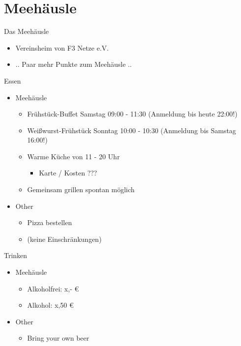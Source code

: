 \section{Meehäusle}

\begin{frame}{Das Meehäusle}
    \begin{itemize}
        \item Vereinsheim von F3 Netze e.V.
        \item .. Paar mehr Punkte zum Meehäusle ..
    \end{itemize}
\end{frame}

\begin{frame}{Essen}
    \begin{itemize}
        \item Meehäusle
        \begin{itemize}
            \item Frühstück-Buffet Samstag 09:00 - 11:30 (Anmeldung bis heute 22:00!)
            \item Weißwurst-Frühstück Sonntag 10:00 - 10:30 (Anmeldung bis Samstag 16:00!)
            \item Warme Küche von 11 - 20 Uhr
            \begin{itemize}
                \item Karte / Kosten ???
            \end{itemize}
            \item Gemeinsam grillen spontan möglich
        \end{itemize}
        \item Other
        \begin{itemize}
            \item Pizza bestellen
            \item (keine Einschränkungen)
        \end{itemize}
    \end{itemize}
\end{frame}

\begin{frame}{Trinken}
    \begin{itemize}
        \item Meehäusle
        \begin{itemize}
            \item Alkoholfrei: x,- €
            \item Alkohol: x,50 €
        \end{itemize}
        \item Other
        \begin{itemize}
            \item Bring your own beer
        \end{itemize}
    \end{itemize}
\end{frame}

